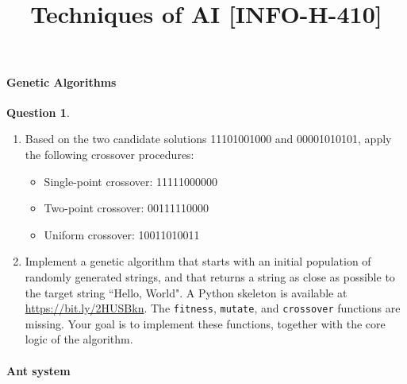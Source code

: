 \documentclass[11pt,a4paper]{article}
\date{\vspace{-1.7cm}\version}
\title{\vspace{-2cm} \tpnumber \\ Techniques of AI [INFO-H-410] \ifthenelse{\boolean{corrige}}{~\\Correction}{}}
\theoremstyle{definition}%
\newtheorem{Q}{Question}[] %
\begin{document}

\maketitle


\paragraph{Genetic Algorithms}

\begin{Q}
\begin{enumerate}
\item Based on the two candidate solutions 11101001000 and 
00001010101, apply the following crossover procedures:
\begin{itemize}
	\item Single-point crossover: 11111000000
	\item Two-point crossover: 	  00111110000
	\item Uniform crossover: 	  10011010011
\end{itemize}
\item Implement a genetic algorithm that starts with an initial
population of randomly generated strings, and that returns a string 
as close as possible to the target string ``Hello, World". A Python 
skeleton is available at  \url{https://bit.ly/2HUSBkn}. The 
\texttt{fitness}, \texttt{mutate}, 
and \texttt{crossover} functions are missing. Your goal is to 
implement these functions, together with the core logic of the 
algorithm.  
\end{enumerate}

\end{Q}

\paragraph{Ant system}
\end{document}
